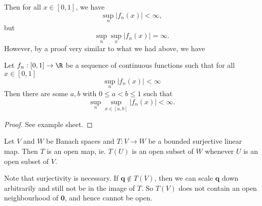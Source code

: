 \documentclass[a4paper]{article}
\begin{document}
Then for all $x\in [0, 1]$, we have
\[
  \sup_n |f_n(x)| < \infty,
\]
but
\[
  \sup_n \sup_x |f_n(x)| = \infty.
\]
However, by a proof very similar to what we had above, we have
\begin{thm}[Osgood]
  Let $f_n: [0, 1] \to \R$ be a sequence of continuous functions such that for all $x\in [0, 1]$
  \[
    \sup_n |f_n(x)| < \infty
  \]
  Then there are some $a, b$ with $0 \leq a < b \leq 1$ such that
  \[
    \sup_n \sup_{x\in [a, b]} |f_n(x)| < \infty.
  \]
\end{thm}

\begin{proof}
  See example sheet.
\end{proof}

\begin{thm}
  Let $V$ and $W$ be Banach spaces and $T: V\to W$ be a bounded surjective linear map. Then $T$ is an open map, ie. $T(U)$ is an open subset of $W$ whenever $U$ is an open subset of $V$.
\end{thm}

Note that surjectivity is necessary. If $\mathbf{q}\not\in T(V)$, then we can scale $\mathbf{q}$ down arbitrarily and still not be in the image of $T$. So $T(V)$ does not contain an open neighbourhood of $\mathbf{0}$, and hence cannot be open.
\end{document}
